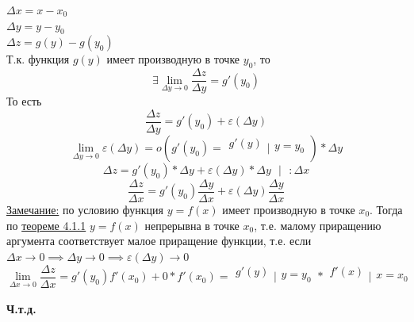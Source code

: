 \documentclass[12pt]{article}
\begin{document}
    \begin{adjustwidth}{1.5em}{1.5em}
        $\Delta x = x-x_0$\\
        $\Delta y = y-y_0$\\
        $\Delta z = g(y) - g(y_0)$\\
        Т.к. функция $g(y)$ имеет производную в точке $y_0$, то
        \[ \exists \lim_{\Delta y \to 0} \frac{\Delta z}{\Delta y} = g'(y_0) \]
        То есть
        \[ \frac{\Delta z}{\Delta y} = g'(y_0) + \varepsilon(\Delta y) \]
        \[ \lim_{\Delta y \to 0} \varepsilon(\Delta y) = o\left(g'(y_0) = \begin{matrix}g'(y)\\\\\end{matrix}\Big|\begin{matrix}\\y = y_0\\\end{matrix}\right) * \Delta y \]
        \[ \Delta z = g'(y_0) * \Delta y + \varepsilon(\Delta y) * \Delta y \text{ } \big| \text{ } : \Delta x \]
        \[ \frac{\Delta z}{\Delta x} = g'(y_0) \frac{\Delta y}{\Delta x} + \varepsilon(\Delta y)\frac{\Delta y}{\Delta x} \]
        \underline{Замечание:} по условию функция $y = f(x)$ имеет производную в точке $x_0$. Тогда по \hyperref[th:4.1.1]{теореме 4.1.1} $y = f(x)$ непрерывна в точке $x_0$, т.е. малому приращению аргумента соответствует малое приращение функции, т.е. если $\Delta x \to 0 \implies \Delta y \to 0 \implies \varepsilon(\Delta y) \to 0$
        \[ \lim_{\Delta x \to 0}\frac{\Delta z}{\Delta x} = g'(y_0)f'(x_0) + 0*f'(x_0) = \begin{matrix}g'(y)\\\\\end{matrix}\Big|\begin{matrix}\\y = y_0\\\end{matrix} * \begin{matrix}f'(x)\\\\\end{matrix}\Big|\begin{matrix}\\x = x_0\\\end{matrix} \]
        \begin{center}
            \textbf{Ч.т.д.}
        \end{center}
    \end{adjustwidth}
\end{document}
